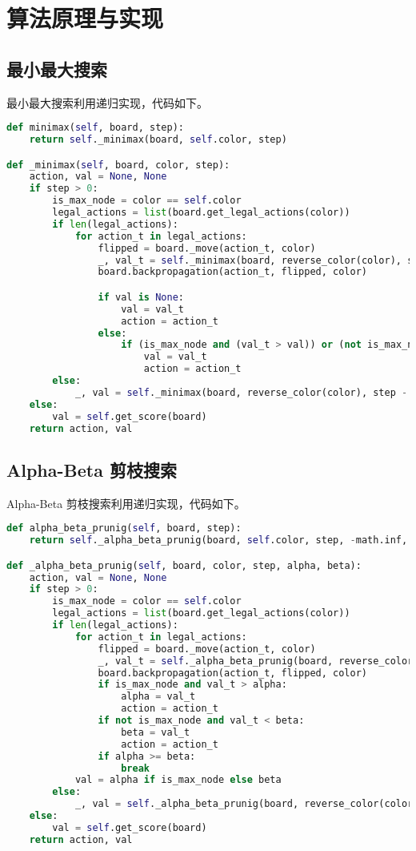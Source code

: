 \documentclass{zjureport-zh}
\begin{document}
\newpage
\section{算法原理与实现}
\subsection{最小最大搜索}
\par 最小最大搜索利用递归实现，代码如下。
\begin{lstlisting}[language=python]
def minimax(self, board, step):
	return self._minimax(board, self.color, step)

def _minimax(self, board, color, step):
	action, val = None, None
	if step > 0:
		is_max_node = color == self.color
		legal_actions = list(board.get_legal_actions(color))
		if len(legal_actions):
			for action_t in legal_actions:
				flipped = board._move(action_t, color)
				_, val_t = self._minimax(board, reverse_color(color), step - 1)
				board.backpropagation(action_t, flipped, color)

				if val is None:
					val = val_t
					action = action_t
				else:
					if (is_max_node and (val_t > val)) or (not is_max_node and (val_t < val)):
						val = val_t
						action = action_t
		else:
			_, val = self._minimax(board, reverse_color(color), step - 1)
	else:
		val = self.get_score(board)
	return action, val
\end{lstlisting}

\newpage
\subsection{Alpha-Beta 剪枝搜索}
\par Alpha-Beta 剪枝搜索利用递归实现，代码如下。
\begin{lstlisting}[language=python]
def alpha_beta_prunig(self, board, step):
	return self._alpha_beta_prunig(board, self.color, step, -math.inf, math.inf)

def _alpha_beta_prunig(self, board, color, step, alpha, beta):
	action, val = None, None
	if step > 0:
		is_max_node = color == self.color
		legal_actions = list(board.get_legal_actions(color))
		if len(legal_actions):
			for action_t in legal_actions:
				flipped = board._move(action_t, color)
				_, val_t = self._alpha_beta_prunig(board, reverse_color(color), step - 1, alpha, beta)
				board.backpropagation(action_t, flipped, color)
				if is_max_node and val_t > alpha:
					alpha = val_t
					action = action_t
				if not is_max_node and val_t < beta:
					beta = val_t
					action = action_t
				if alpha >= beta:
					break
			val = alpha if is_max_node else beta
		else:
			_, val = self._alpha_beta_prunig(board, reverse_color(color), step - 1, alpha, beta)
	else:
		val = self.get_score(board)
	return action, val
\end{lstlisting}
\end{document}
